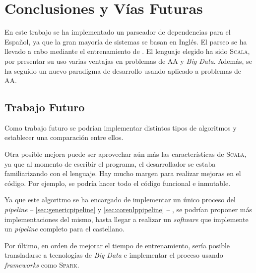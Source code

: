 \chapter{Conclusiones y Vías Futuras}
\label{ch:future}

En este trabajo se ha implementado un parseador de dependencias para el Español,
ya que la gran mayoría de sistemas se basan en Inglés. El parseo se ha llevado a
cabo mediante el entrenamiento de . El lenguaje elegido ha sido
\textsc{Scala}, por presentar su uso varias ventajas en problemas de \acf{AA} y
\emph{Big Data}. Además, se ha seguido un nuevo paradigma de desarrollo usando
 aplicado a problemas de \acf{AA}.

\section{Trabajo Futuro}
\label{sec:future}

Como trabajo futuro se podrían implementar distintos tipos de algoritmos y
establecer una comparación entre ellos.

Otra posible mejora puede ser aprovechar aún más las características de
\textsc{Scala}, ya que al momento de escribir el programa, el desarrollador se
estaba familiarizando con el lenguaje. Hay mucho margen para realizar mejoras en
el código. Por ejemplo, se podría hacer todo el código funcional e
inmutable.

Ya que este algoritmo se ha encargado de implementar un único proceso del
\emph{pipeline} -- \autoref{sec:genericpipeline} y \autoref{sec:corenlppipeline}
-- , se podrían proponer más implementaciones del mismo, hasta llegar a realizar
un \emph{software} que implemente un \emph{pipeline} completo para el
castellano.

Por último, en orden de mejorar el tiempo de entrenamiento, sería posible
transladarse a tecnologías de \emph{Big Data} e implementar el proceso usando
\emph{frameworks} como \textsc{Spark}.

